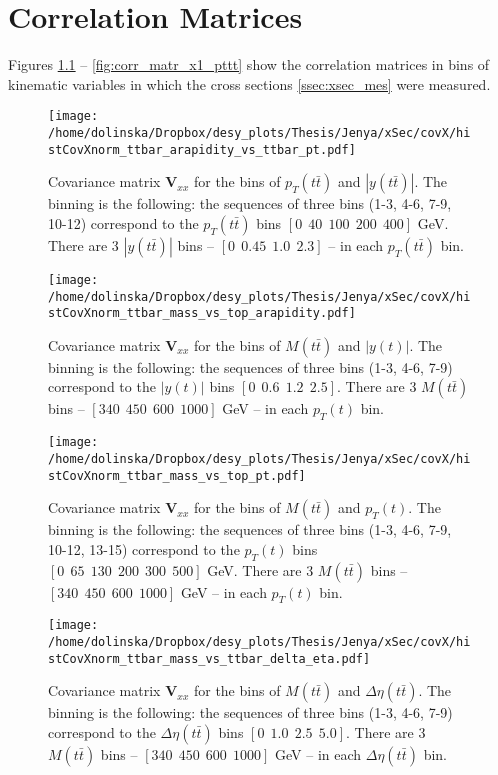 \chapter{Correlation Matrices}\label{appendix:corr_m}

Figures \ref{fig:corr_matr_pttt_ytt} -- \ref{fig:corr_matr_x1_pttt} show the correlation matrices in bins of kinematic variables in which the cross sections \ref{ssec:xsec_mes}
were measured.

\begin{figure}[h]
  \centering
  \texttt{[image: /home/dolinska/Dropbox/desy\_plots/Thesis/Jenya/xSec/covX/histCovXnorm\_ttbar\_arapidity\_vs\_ttbar\_pt.pdf]}
  \caption{Covariance matrix $\mathbf{V}_{xx}$ for the bins of $p_{T}(t\bar{t})$ and $|y(t\bar{t})|$. The binning is the following:
  the sequences of three bins (1-3, 4-6, 7-9, 10-12) correspond to the $p_{T}(t\bar{t})$ bins $[0\:\:40\:\:100\:\:200\:\:400]$ GeV.
          There are 3 $|y(t\bar{t})|$ bins -- $[0\:\:0.45\:\:1.0\:\:2.3]$ -- in each $p_{T}(t\bar{t})$ bin.}
  \label{fig:corr_matr_pttt_ytt}
\end{figure}

\begin{figure}[p]
  \centering
  \texttt{[image: /home/dolinska/Dropbox/desy\_plots/Thesis/Jenya/xSec/covX/histCovXnorm\_ttbar\_mass\_vs\_top\_arapidity.pdf]}
  \caption{Covariance matrix $\mathbf{V}_{xx}$ for the bins of $M(t\bar{t})$ and $|y(t)|$. The binning is the following:
  the sequences of three bins (1-3, 4-6, 7-9) correspond to the $|y(t)|$ bins $[0\:\:0.6\:\:1.2\:\:2.5]$.
          There are 3 $M(t\bar{t})$ bins -- $[340\:\:450\:\:600\:\:1000]$ GeV -- in each $p_{T}(t)$ bin.}
  \label{fig:corr_matr_yt_Mtt}
\end{figure}

\begin{figure}[p]
  \centering
  \texttt{[image: /home/dolinska/Dropbox/desy\_plots/Thesis/Jenya/xSec/covX/histCovXnorm\_ttbar\_mass\_vs\_top\_pt.pdf]}
  \caption{Covariance matrix $\mathbf{V}_{xx}$ for the bins of $M(t\bar{t})$ and $p_{T}(t)$. The binning is the following:
  the sequences of three bins (1-3, 4-6, 7-9, 10-12, 13-15) correspond to the $p_{T}(t)$ bins $[0\:\:65\:\:130\:\:200\:\:300\:\:500]$ GeV.
          There are 3 $M(t\bar{t})$ bins -- $[340\:\:450\:\:600\:\:1000]$ GeV -- in each $p_{T}(t)$ bin.}
  \label{fig:corr_matr_Mtt_pt}
\end{figure}

\begin{figure}[p]
  \centering
  \texttt{[image: /home/dolinska/Dropbox/desy\_plots/Thesis/Jenya/xSec/covX/histCovXnorm\_ttbar\_mass\_vs\_ttbar\_delta\_eta.pdf]}
  \caption{Covariance matrix $\mathbf{V}_{xx}$ for the bins of $M(t\bar{t})$ and $\Delta\eta(t\bar{t})$. The binning is the following:
  the sequences of three bins (1-3, 4-6, 7-9) correspond to the $\Delta\eta(t\bar{t})$ bins $[0\:\:1.0\:\:2.5\:\:5.0]$.
          There are 3 $M(t\bar{t})$ bins -- $[340\:\:450\:\:600\:\:1000]$ GeV -- in each $\Delta\eta(t\bar{t})$ bin.}
  \label{fig:corr_matr_eta_Mtt}
\end{figure}

